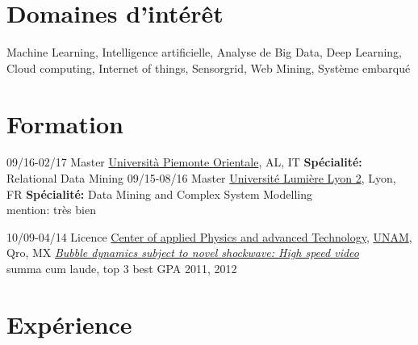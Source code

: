 \documentclass[]{friggeri-cv}
\begin{document}
\section{Domaines d'intérêt}

Machine Learning, Intelligence artificielle, Analyse de Big Data, Deep Learning, %
Cloud computing, Internet of things,  Sensorgrid,  
Web Mining, Système embarqué

\section{Formation}

\begin{entrylist}
\entry
{09/16-02/17}
{Master \href{http://www.em-dmkm.eu/}
	{}}
{\href{http://www.uniupo.it/}{Università Piemonte Orientale}, AL, IT}
{\textbf{Spécialité:} Relational Data Mining
}
\entry
{09/15-08/16}
{Master \href{http://www.em-dmkm.eu/}
             {}}
     {\href{http://www.univ-lyon2.fr/}{Université Lumière Lyon 2}, Lyon, FR}
    {\textbf{Spécialité:} Data Mining and Complex System Modelling\\ mention: tr\`{e}s bien}
    
\entry
{10/09-04/14}
{Licence \href{http://www.fata.unam.mx/tecnologia}
             {}}
  {\href{http://www.fata.unam.mx/}{Center of applied Physics and advanced Technology}, \href{http://www.unam.mx/}{UNAM}, Qro, MX}           
{\href{https://dl.dropboxusercontent.com/u/2115508/Tesis.pdf}{\emph{Bubble dynamics subject to novel shockwave: High speed video}}\\
summa cum laude, top 3 best GPA 2011, 2012%
}
\end{entrylist}


\section{Expérience}
\end{document}
